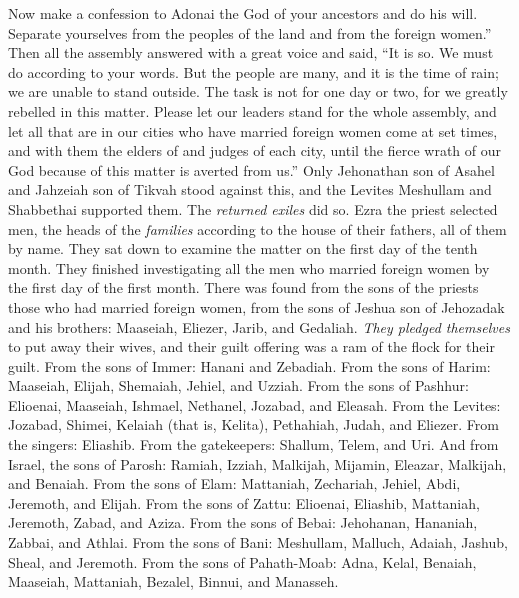 \begin{biblechapter}
\verse Now make a confession to Adonai the God of your ancestors and do his will. Separate yourselves from the peoples of the land and from the foreign women.”
\verse Then all the assembly answered with a great voice and said, “It is so. We must do according to your words.
\verse But the people are many, and it is the time of rain; we are unable to stand outside. The task is not for one day or two, for we greatly rebelled in this matter.
\verse Please let our leaders stand for the whole assembly, and let all that are in our cities who have married foreign women come at set times, and with them the elders of and judges of each city, until the fierce wrath of our God because of this matter is averted from us.”
\verse Only Jehonathan son of Asahel and Jahzeiah son of Tikvah stood against this, and the Levites Meshullam and Shabbethai supported them.
\verse The \textit{returned exiles} did so. Ezra the priest selected men, the heads of the \textit{families} according to the house of their fathers, all of them by name. They sat down to examine the matter on the first day of the tenth month.
\verse They finished investigating all the men who married foreign women by the first day of the first month.
\verse There was found from the sons of the priests those who had married foreign women, from the sons of Jeshua son of Jehozadak and his brothers: Maaseiah, Eliezer, Jarib, and Gedaliah.
\verse \textit{They pledged themselves} to put away their wives, and their guilt offering was a ram of the flock for their guilt.
\verse From the sons of Immer: Hanani and Zebadiah.
\verse From the sons of Harim: Maaseiah, Elijah, Shemaiah, Jehiel, and Uzziah.
\verse From the sons of Pashhur: Elioenai, Maaseiah, Ishmael, Nethanel, Jozabad, and Eleasah.
\verse From the Levites: Jozabad, Shimei, Kelaiah (that is, Kelita), Pethahiah, Judah, and Eliezer.
\verse From the singers: Eliashib. From the gatekeepers: Shallum, Telem, and Uri.
\verse And from Israel, the sons of Parosh: Ramiah, Izziah, Malkijah, Mijamin, Eleazar, Malkijah, and Benaiah.
\verse From the sons of Elam: Mattaniah, Zechariah, Jehiel, Abdi, Jeremoth, and Elijah.
\verse From the sons of Zattu: Elioenai, Eliashib, Mattaniah, Jeremoth, Zabad, and Aziza.
\verse From the sons of Bebai: Jehohanan, Hananiah, Zabbai, and Athlai.
\verse From the sons of Bani: Meshullam, Malluch, Adaiah, Jashub, Sheal, and Jeremoth.
\verse From the sons of Pahath-Moab: Adna, Kelal, Benaiah, Maaseiah, Mattaniah, Bezalel, Binnui, and Manasseh.

\end{biblechapter}
